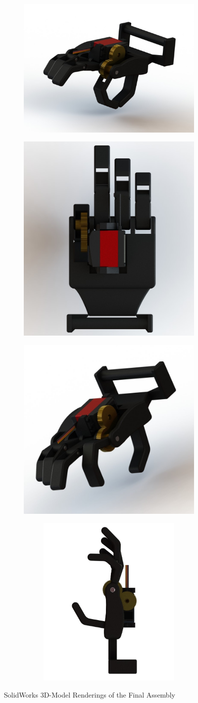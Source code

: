 \documentclass[11.5pt]{article}
\begin{document}
\begin{figure}[H]
\centering
\begin{subfigure}
  \centering
  \includegraphics[width=0.25\columnwidth]{2d/3DModelsPics/n1.jpg}
  \label{fig:sub1}
\end{subfigure}%
\begin{subfigure}
  \centering
  \includegraphics[width=0.20\columnwidth]{2d/3DModelsPics/n2.jpg}
  \label{fig:sub2}
\end{subfigure}
\begin{subfigure}
  \centering
  \includegraphics[width=0.235\columnwidth]{2d/3DModelsPics/n3.jpg}
  \begin{subfigure}
  \centering
  \includegraphics[width=0.18\columnwidth]{2d/3DModelsPics/n6.jpg}
  \label{fig:sub2}
\end{subfigure}
  \label{fig:sub2}
\end{subfigure}
\caption{SolidWorks 3D-Model Renderings of the Final Assembly}
\label{fig:actual3d}
\end{figure}
\end{document}
